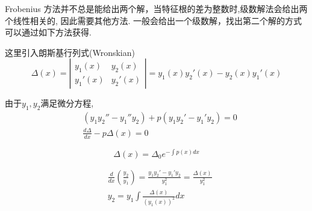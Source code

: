 Frobenius 方法并不总是能给出两个解，当特征根的差为整数时,级数解法会给出两个线性相关的, 因此需要其他方法.
一般会给出一个级数解，找出第二个解的方式可以通过如下方法获得.

这里引入朗斯基行列式(Wronskian)
$$
\Delta(x)=\left|\begin{array}{ll}
y_1(x) & y_2(x) \\
y_1'(x) & y_2'(x)
\end{array}\right|= y_1(x) y_2'(x) - y_2(x) y_1'(x)
$$

由于$y_1, y_2$满足微分方程,
$$
\begin{aligned}
& \left(y_1 y_2''-y_1'' 
y_2\right)+p\left(y_1 y_2'-y_1' y_2\right) = 0\\
& \frac{d \Delta}{d x} - p \Delta(x)=0
\end{aligned}
$$

$$
\Delta(x)=\Delta_0 e^{-\int p(x) d x}
$$

$$
\begin{aligned}
& \frac{d}{d x}\left(\frac{y_{2}}{y_1}\right)=\frac{y_{1} y_{2}'-y_{1}' y_{2}}{y_{1}^2}=\frac{\Delta(x)}{y_{1}^2} \\
& y_{2}=y_{1} \int \frac{\Delta(x)}{\left(y_{1}(x)\right)^2} d x
\end{aligned}
$$

